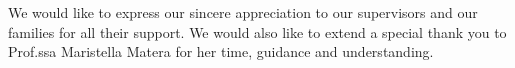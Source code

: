 We would like to express our sincere appreciation to our supervisors and our families for all their support.
We would also like to extend a special thank you to Prof.ssa Maristella Matera for her time, guidance and understanding.
